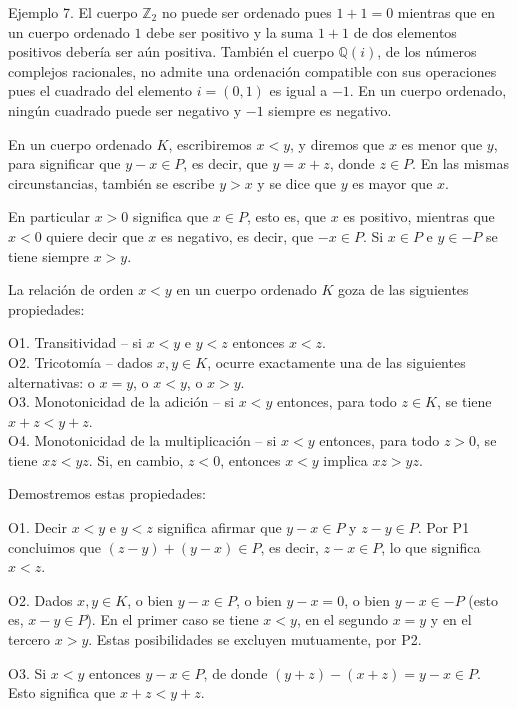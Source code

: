 \documentclass[12pt,oneside]{book}
\begin{document}
Ejemplo 7. El cuerpo \(\mathbb{Z}_2\) no puede ser ordenado pues \(1 + 1 = 0\) mientras que en un cuerpo ordenado \(1\) debe ser positivo y la suma \(1 + 1\) de dos elementos positivos debería ser aún positiva. También el cuerpo \(\mathbb{Q}(i)\), de los números complejos racionales, no admite una ordenación compatible con sus operaciones pues el cuadrado del elemento \(i = (0,1)\) es igual a \(-1\). En un cuerpo ordenado, ningún cuadrado puede ser negativo y \(-1\) siempre es negativo.

En un cuerpo ordenado \(K\), escribiremos \(x < y\), y diremos que \(x\) es menor que \(y\), para significar que \(y - x \in P\), es decir, que \(y = x + z\), donde \(z \in P\). En las mismas circunstancias, también se escribe \(y > x\) y se dice que \(y\) es mayor que \(x\).

En particular \(x > 0\) significa que \(x \in P\), esto es, que \(x\) es positivo, mientras que \(x < 0\) quiere decir que \(x\) es negativo, es decir, que \(-x \in P\). Si \(x \in P\) e \(y \in -P\) se tiene siempre \(x > y\).

La relación de orden \(x < y\) en un cuerpo ordenado \(K\) goza de las siguientes propiedades:

O1. Transitividad – si \(x < y\) e \(y < z\) entonces \(x < z\).\\
O2. Tricotomía – dados \(x, y \in K\), ocurre exactamente una de las siguientes alternativas: o \(x = y\), o \(x < y\), o \(x > y\).\\
O3. Monotonicidad de la adición – si \(x < y\) entonces, para todo \(z \in K\), se tiene \(x + z < y + z\).\\
O4. Monotonicidad de la multiplicación – si \(x < y\) entonces, para todo \(z > 0\), se tiene \(xz < yz\). Si, en cambio, \(z < 0\), entonces \(x < y\) implica \(xz > yz\).

Demostremos estas propiedades:

O1. Decir \(x < y\) e \(y < z\) significa afirmar que \(y - x \in P\) y \(z - y \in P\). Por P1 concluimos que \((z - y) + (y - x) \in P\), es decir, \(z - x \in P\), lo que significa \(x < z\).

O2. Dados \(x, y \in K\), o bien \(y - x \in P\), o bien \(y - x = 0\), o bien \(y - x \in -P\) (esto es, \(x - y \in P\)). En el primer caso se tiene \(x < y\), en el segundo \(x = y\) y en el tercero \(x > y\). Estas posibilidades se excluyen mutuamente, por P2.

O3. Si \(x < y\) entonces \(y - x \in P\), de donde \((y + z) - (x + z) = y - x \in P\). Esto significa que \(x + z < y + z\).
\end{document}
